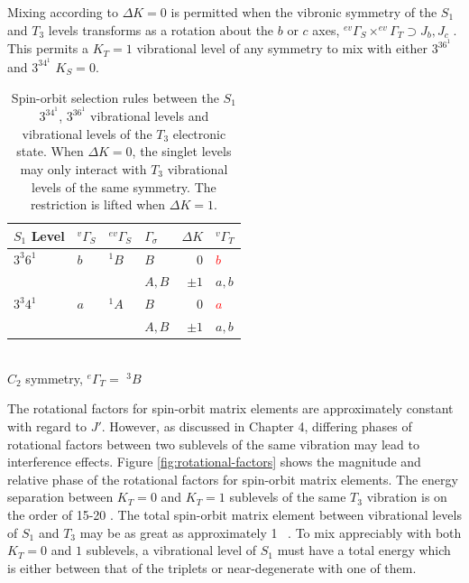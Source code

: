 \documentclass[12pt]{mitthesis}
\begin{document}
Mixing according to $\Delta K =0$ is permitted when the vibronic
symmetry of the $S_1$ and $T_3$ levels transforms as a rotation about
the $b$ or $c$ axes, $^{ev}\Gamma_S \times ^{ev}\Gamma_T \supset J_b,
J_c$ \cite{stevens73}.  This permits a $K_T=1$ vibrational level of any
symmetry to mix with either $3^36^1$ and $3^34^1$ $K_S=0$.

\begin{table}
  \caption{Spin-orbit selection rules between the $S_1$ $3^34^1$,
    $3^36^1$ vibrational levels and vibrational levels of the $T_3$
    electronic state.  When $\Delta K=0$, the singlet levels may only
    interact with $T_3$ vibrational levels of the same symmetry.  The
    restriction is lifted when $\Delta K=1$.
  }
  \label{table:delta-k}
  \centering
  \begin{tabular}{llllrl}
    \\
    $S_1$ Level
    & $^{v}\Gamma_S$ & $^{ev}\Gamma_S$ & $\Gamma_\sigma$ & $\Delta K$ & $^{v}\Gamma_T$ \\
    \toprule
    
    $3^3 6^1$ 
    & $b$ & $^{1}B$ & $B$ & $0$ & \textcolor{red}{$b$} \\
    & & & $A, B$ & $\pm1$ & $a, b$ \\
    
    $3^3 4^1$ 
    & $a$ & $^{1}A$ & $B$ & $0$ & \textcolor{red}{$a$} \\
    & & & $A, B$ & $\pm1$ & $a, b$ \\[10pt]
    
  \end{tabular}\\[5mm]
  
  $C_{2}$ symmetry, $^{e}\Gamma_T =$ $^{3}B$
\end{table}

The rotational factors for spin-orbit matrix elements are
approximately constant with regard to $J'$.  However, as discussed in
Chapter 4, differing phases of rotational factors between two
sublevels of the same vibration may lead to interference effects.
Figure \ref{fig:rotational-factors} shows the magnitude and relative
phase of the rotational factors for spin-orbit matrix elements.  The
energy separation between $K_T=0$ and $K_T=1$ sublevels of the same
$T_3$ vibration is on the order of 15-20 \rcm \cite{thom07}.  The
total spin-orbit matrix element between vibrational levels of $S_1$
and $T_3$ may be as great as approximately 1 \rcm\ \cite{thom07}.  To
mix appreciably with both $K_T=0$ and $1$ sublevels, a vibrational
level of $S_1$ must have a total energy which is either between that
of the triplets or near-degenerate with one of them.
\end{document}
